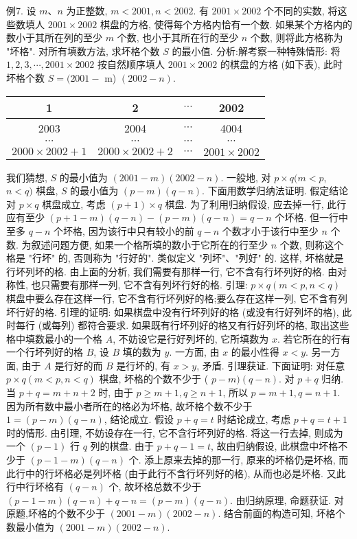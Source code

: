 例7. 设 $m 、 n$ 为正整数, $m<2001, n<2002$. 有 $2001 \times 2002$ 个不同的实数, 将这些数填人 $2001 \times 2002$ 棋盘的方格, 使得每个方格内恰有一个数.
如果某个方格内的数小于其所在列的至少 $m$ 个数, 也小于其所在行的至少 $n$ 个数, 则将此方格称为 "坏格". 对所有填数方法, 求坏格个数 $S$ 的最小值.
分析:解考察一种特殊情形: 将 $1,2,3, \cdots, 2001 \times 2002$ 按自然顺序填人 $2001 \times 2002$ 的棋盘的方格 (如下表), 此时坏格个数 $S=(2001-$ m) $(2002-n)$.
\begin{tabular}{|c|c|c|c|}
\hline 1 & 2 & $\cdots$ & 2002 \\
\hline 2003 & 2004 & $\cdots$ & 4004 \\
\hline$\cdots$ & $\cdots$ & $\cdots$ & $\cdots$ \\
\hline $2000 \times 2002+1$ & $2000 \times 2002+2$ & $\cdots$ & $2001 \times 2002$ \\
\hline
\end{tabular}
我们猜想, $S$ 的最小值为 $(2001-m)(2002-n)$. 一般地, 对 $p \times q(m<p$, $n<q)$ 棋盘, $S$ 的最小值为 $(p-m)(q-n)$. 下面用数学归纳法证明.
假定结论对 $p \times q$ 棋盘成立, 考虑 $(p+1) \times q$ 棋盘.
为了利用归纳假设, 应去掉一行, 此行应有至少 $(p+1-m)(q-n)-(p-m)(q-n)=q-n$ 个坏格.
但一行中至多 $q-n$ 个坏格, 因为该行中只有较小的前 $q-n$ 个数才小于该行中至少 $n$ 个数.
为叙述问题方便, 如果一个格所填的数小于它所在的行至少 $n$ 个数, 则称这个格是 "行坏" 的, 否则称为 "行好的". 类似定义 "列坏"、"列好" 的.
这样, 坏格就是行坏列坏的格.
由上面的分析, 我们需要有那样一行, 它不含有行坏列好的格.
由对称性, 也只需要有那样一列, 它不含有列坏行好的格.
引理: $p \times q(m<p, n<q)$ 棋盘中要么存在这样一行, 它不含有行坏列好的格;要么存在这样一列, 它不含有列坏行好的格.
引理的证明: 如果棋盘中没有行坏列好的格 (或没有行好列坏的格), 此时每行 (或每列) 都符合要求.
如果既有行坏列好的格又有行好列坏的格, 取出这些格中填数最小的一个格 $A$, 不妨设它是行好列坏的, 它所填数为 $x$. 若它所在的行有一个行坏列好的格 $B$, 设 $B$ 填的数为 $y$. 一方面, 由 $x$ 的最小性得 $x<y$. 另一方面, 由于 $A$ 是行好的而 $B$ 是行坏的, 有 $x>y$, 矛盾.
引理获证.
下面证明: 对任意 $p \times q(m<p, n<q)$ 棋盘, 坏格的个数不少于 ( $p- m)(q-n)$.
对 $p+q$ 归纳.
当 $p+q=m+n+2$ 时, 由于 $p \geqslant m+1, q \geqslant n+1$, 所以 $p=m+1, q=n+1$. 因为所有数中最小者所在的格必为坏格, 故坏格个数不少于 $1=(p-m)(q-n)$, 结论成立.
假设 $p+q=t$ 时结论成立, 考虑 $p+q= t+1$ 时的情形.
由引理, 不妨设存在一行, 它不含行坏列好的格.
将这一行去掉, 则成为一个 $(p-1)$ 行 $q$ 列的棋盘.
由于 $p+q-1=t$, 故由归纳假设, 此棋盘中坏格不少于 $(p-1-m)(q-n)$ 个.
添上原来去掉的那一行, 原来的坏格仍是坏格, 而此行中的行坏格必是列坏格 (由于此行不含行坏列好的格), 从而也必是坏格.
又此行中行坏格有 $(q-n)$ 个, 故坏格总数不少于 $(p-1- m)(q-n)+q-n=(p-m)(q-n)$. 由归纳原理, 命题获证.
对原题,坏格的个数不少于 $(2001-m)(2002-n)$. 结合前面的构造可知, 坏格个数最小值为 $(2001-m)(2002-n)$.



